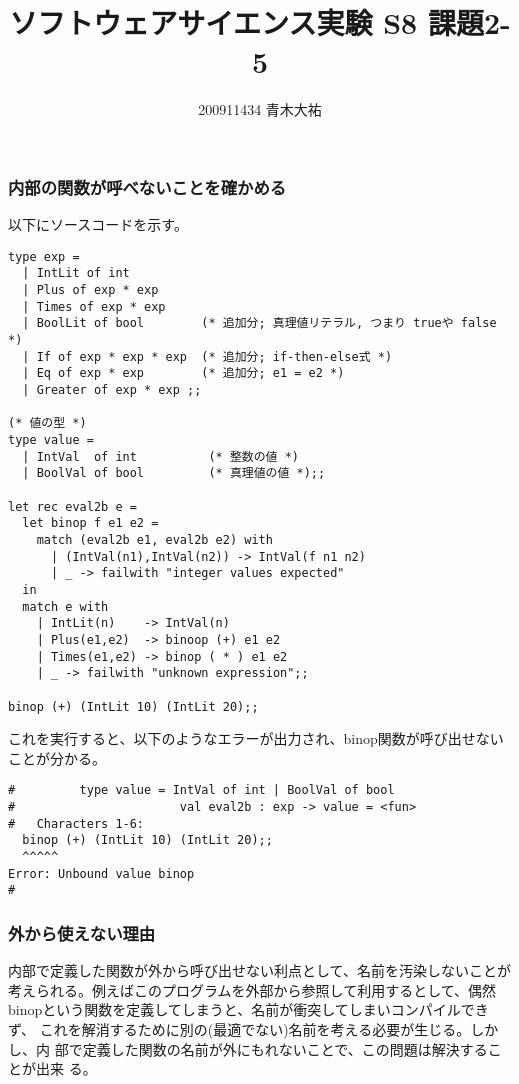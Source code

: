 \documentclass[a4paper,9pt]{jarticle}
\title{ソフトウェアサイエンス実験 S8 課題2-5}
\author{200911434 青木大祐}
\begin{document}
\maketitle
\setcounter{section}{2}
\setcounter{subsection}{5}

\newpage

\subsubsection{内部の関数が呼べないことを確かめる}
以下にソースコードを示す。
\begin{lstlisting}
type exp =
  | IntLit of int
  | Plus of exp * exp 
  | Times of exp * exp
  | BoolLit of bool        (* 追加分; 真理値リテラル, つまり trueや false  *)
  | If of exp * exp * exp  (* 追加分; if-then-else式 *)
  | Eq of exp * exp        (* 追加分; e1 = e2 *)
  | Greater of exp * exp ;;

(* 値の型 *)
type value =
  | IntVal  of int          (* 整数の値 *)
  | BoolVal of bool         (* 真理値の値 *);;

let rec eval2b e =
  let binop f e1 e2 =
    match (eval2b e1, eval2b e2) with
      | (IntVal(n1),IntVal(n2)) -> IntVal(f n1 n2)
      | _ -> failwith "integer values expected"
  in 
  match e with
    | IntLit(n)    -> IntVal(n)
    | Plus(e1,e2)  -> binoop (+) e1 e2
    | Times(e1,e2) -> binop ( * ) e1 e2
    | _ -> failwith "unknown expression";;

binop (+) (IntLit 10) (IntLit 20);;
\end{lstlisting}

これを実行すると、以下のようなエラーが出力され、binop関数が呼び出せないことが分かる。
\begin{lstlisting}
#         type value = IntVal of int | BoolVal of bool
#                       val eval2b : exp -> value = <fun>
#   Characters 1-6:
  binop (+) (IntLit 10) (IntLit 20);;
  ^^^^^
Error: Unbound value binop
# 
\end{lstlisting}

\subsubsection{外から使えない理由}
内部で定義した関数が外から呼び出せない利点として、名前を汚染しないことが
考えられる。例えばこのプログラムを外部から参照して利用するとして、偶然
binopという関数を定義してしまうと、名前が衝突してしまいコンパイルできず、
これを解消するために別の(最適でない)名前を考える必要が生じる。しかし、内
部で定義した関数の名前が外にもれないことで、この問題は解決することが出来
る。
\end{document}
